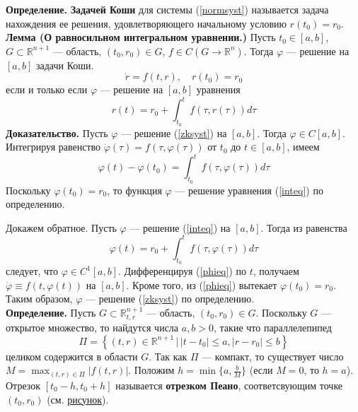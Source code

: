 \documentclass{article}
\begin{document}
\noindent \textbf{Определение.} \textbf{Задачей Коши} для системы (\ref{normsyst}) называется задача нахождения ее решения, удовлетворяющего начальному условию $r(t_0) = r_0$.\\

\noindent \textbf{Лемма (О равносильном интегральном уравнении.)} Пусть $t_0 \in [a,b]$, $G \subset \mathbb{R}^{n + 1}$ --- область, $(t_0, r_0) \in G$, $f \in C(G \to \mathbb{R}^n)$. Тогда $\varphi$ --- решение на $[a,b]$ задачи Коши.
\begin{equation}
    \dot{r} = f(t,r), \quad r(t_0)=r_0 \label{zksyst}
\end{equation}
если и только если $\varphi$ --- решение на $[a,b]$ уравнения
\begin{equation}
    r(t) = r_0 + \int_{t_0}^{t} f(\tau, r(\tau))d\tau \label{inteq}
\end{equation}
\textbf{Доказательство.} Пусть $\varphi$ --- решение (\ref{zksyst}) на $[a,b]$. Тогда $\varphi \in C[a,b]$. Интегрируя равенство $\dot{\varphi}(\tau) = f(\tau, \varphi(\tau))$ от $t_0$ до $t \in [a,b]$, имеем
\begin{equation*}
    \varphi(t) - \varphi(t_0) = \int_{t_0}^{t} f(\tau, \varphi(\tau))d\tau
\end{equation*}
Поскольку $\varphi(t_0) = r_0$, то функция $\varphi$ --- решение уравнения (\ref{inteq}) по определению.

Докажем обратное. Пусть $\varphi$ --- решение (\ref{inteq}) на $[a,b]$. Тогда из равенства
\begin{equation}
    \varphi(t) = r_0 + \int_{t_0}^{t} f(\tau, \varphi(\tau))d\tau \label{phieq}
\end{equation}
следует, что $\varphi \in C^1[a,b]$. Дифференцируя (\ref{phieq}) по $t$, получаем $\dot{\varphi} \equiv f(t, \varphi(t))$ на $[a,b]$. Кроме того, из (\ref{phieq}) вытекает $\varphi(t_0) = r_0$. Таким образом, $\varphi$ --- решение (\ref{zksyst}) по определению.\\

\noindent \textbf{Определение.} Пусть $G \subset \mathbb{R}_{t,r}^{n+1}$ --- область, $(t_0, r_0) \in G$. Поскольку $G$ --- открытое множество, то найдутся числа $a,b > 0$, такие что параллелепипед
\begin{equation*}
    \Pi = \left\{(t,r) \in \mathbb{R}^{n+1}\,|\, |t-t_0| \le a, |r-r_0|\le b \right\}
\end{equation*}
целиком содержится в области $G$. Так как $\Pi$ --- компакт, то существует число $M = \displaystyle\max_{(t,r)\in \Pi} |f(t,r)|$. Положим $h = \min \{a, \frac{b}{M}\}$ (если $M = 0$, то $h = a$). Отрезок $[t_0 - h, t_0 + h]$ называется \textbf{отрезком Пеано}, соответсвующим точке $(t_0, r_0)$ (см. \hyperref[peano]{рисунок}).
\end{document}
